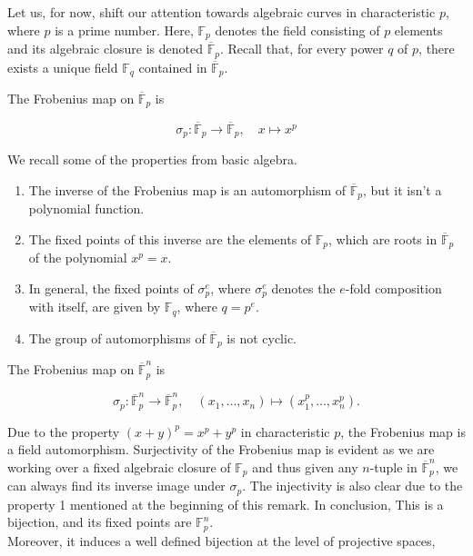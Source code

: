 Let us, for now, shift our attention towards algebraic curves in characteristic \( p \), where \( p \) is a prime number. Here, \( \mathbb{F}_{p} \) denotes the field consisting of \( p \) elements and its algebraic closure is denoted \( \overline{\mathbb{F}}_{p} \). Recall that, for every power \( q \) of \( p \), there exists a unique field \( \mathbb{F}_{q} \) contained in \( \overline{\mathbb{F}}_{p} \). 

\begin{definition}
The Frobenius map on $\overline{\mathbb{F}}_{p}$ is

$$
\sigma_{p}: \overline{\mathbb{F}}_{p} \longrightarrow \overline{\mathbb{F}}_{p}, \quad x \mapsto x^{p}
$$

    
\end{definition}

\begin{remark} We recall some of the properties from basic algebra. 
\begin{enumerate}
    \item The inverse of the Frobenius map is an automorphism of \( \overline{\mathbb{F}}_{p} \), but it isn't a polynomial function.
    \item The fixed points of this inverse are the elements of \( \mathbb{F}_{p} \), which are roots in \( \overline{\mathbb{F}}_{p} \) of the polynomial \( x^{p} = x \).
    \item In general, the fixed points of \( \sigma_{p}^{e} \), where \( \sigma_{p}^{e} \) denotes the $e$-fold composition with itself,  are given by \( \mathbb{F}_{q} \), where \( q = p^{e} \).
    \item The group of automorphisms of \( \overline{\mathbb{F}}_{p} \) is not cyclic.  
    \end{enumerate}
\end{remark} 



\begin{definition}
    The Frobenius map on $\overline{\mathbb{F}}_{p}^{n}$ is

$$
\sigma_{p}: \overline{\mathbb{F}}_{p}^{n} \longrightarrow \overline{\mathbb{F}}_{p}^{n}, \quad\left(x_{1}, \ldots, x_{n}\right) \mapsto\left(x_{1}^{p}, \ldots, x_{n}^{p}\right) .
$$

\end{definition}

\begin{remark}
Due to the property \( (x+y)^{p} = x^{p} + y^{p} \) in characteristic \( p \), the Frobenius map is a field automorphism. Surjectivity of the Frobenius map is evident as we are working over a fixed algebraic closure of $\mathbb{F}_{p}$ and thus given any $n$-tuple in $\overline{\mathbb{F}}_{p}^{n}$, we can always find its inverse image under $\sigma_{p}$. The injectivity is also clear due to the property 1 mentioned at the beginning of this remark. In conclusion, This is a bijection, and its fixed points are $\mathbb{F}_{p}^{n}$. \\
Moreover, it induces a well defined bijection at the level of projective spaces,    
\end{remark}


